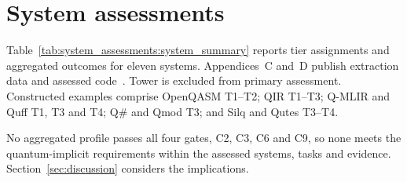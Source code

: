 \section{System assessments}\label{sec:system_assessments}
Table~\ref{tab:system_assessments:system_summary} reports tier assignments and aggregated outcomes for eleven systems.
Appendices~C and~D publish extraction data and assessed code~\cite{kavadias2026qplSurveySupplementary}.
Tower is excluded from primary assessment.
Constructed examples comprise OpenQASM T1--T2; QIR T1--T3; Q-MLIR and Quff T1, T3 and T4; Q\# and Qmod T3; and Silq and Qutes T3--T4.

No aggregated profile passes all four gates, C2, C3, C6 and C9, so none meets the quantum-implicit requirements within the assessed systems, tasks and evidence.
Section~\ref{sec:discussion} considers the implications.

